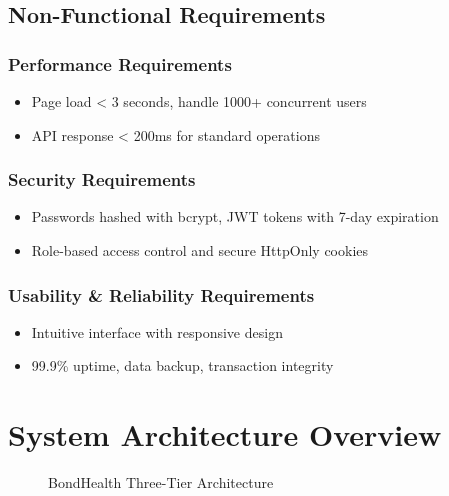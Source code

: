 \subsection{Non-Functional Requirements}

\subsubsection{Performance Requirements}
\begin{itemize}
    \item Page load < 3 seconds, handle 1000+ concurrent users
    \item API response < 200ms for standard operations
\end{itemize}

\subsubsection{Security Requirements}
\begin{itemize}
    \item Passwords hashed with bcrypt, JWT tokens with 7-day expiration
    \item Role-based access control and secure HttpOnly cookies
\end{itemize}

\subsubsection{Usability \& Reliability Requirements}
\begin{itemize}
    \item Intuitive interface with responsive design
    \item 99.9\% uptime, data backup, transaction integrity
\end{itemize}

\section{System Architecture Overview}

\begin{figure}[h]
\centering
{}
\caption{BondHealth Three-Tier Architecture}
\label{fig:architecture}
\end{figure}

